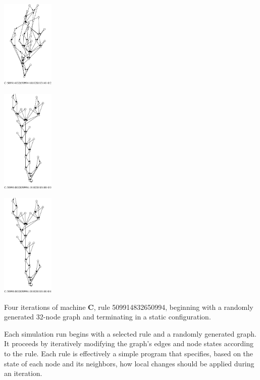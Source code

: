 \documentclass{tufte-handout}
\begin{document}
\begin{marginfigure}
\hspace{3em}
\includegraphics[width=2.5cm]{evol2a_2.ps}
\end{marginfigure}

\begin{marginfigure}
\hspace{3em}
\includegraphics[width=2.5cm]{evol2a_3.ps}
\end{marginfigure}

\begin{marginfigure}
\hspace{3em}
\includegraphics[width=2.5cm]{evol2a_4.ps}
\caption{Four iterations of machine \textbf{C}, rule 509914832650994,
beginning with a randomly generated 32-node graph and terminating in a
static configuration.}
\end{marginfigure}

Each simulation run begins with a selected rule and a randomly generated graph. It proceeds by
iteratively modifying the graph's edges and node states according to the rule.
Each rule is effectively a simple program  that specifies, based on the state
of each node and its neighbors, how local changes should be applied during an
iteration.
\end{document}

